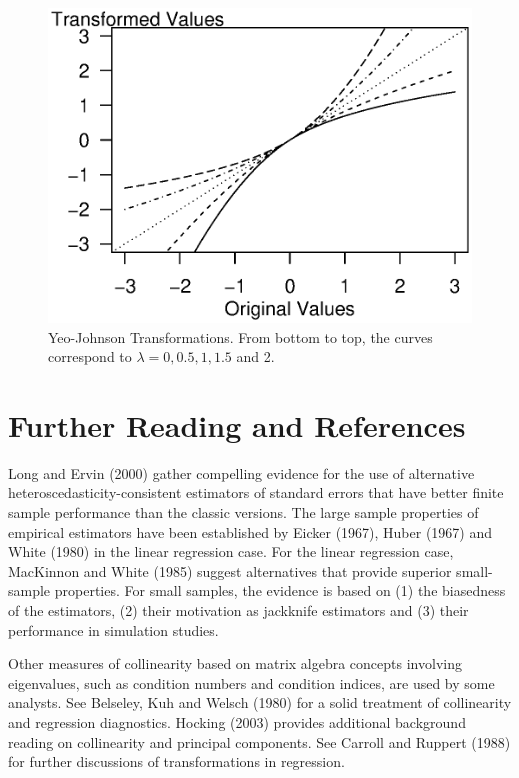 \begin{figure}[htp]
  \centering
    \includegraphics[width=.6\textwidth]{Chapter5/F5Transform.eps}
\caption{\label{F5:Transform} \small Yeo-Johnson Transformations.
From bottom to top, the curves correspond to $\lambda =0,0.5,1,1.5$
and 2.}
\end{figure}



\section{Further Reading and References}

Long and Ervin (2000) gather compelling evidence for the use of
alternative \newline heteroscedasticity-consistent estimators of
standard errors that have better finite sample performance than the
classic versions. The large sample properties of empirical
estimators have been established by Eicker (1967), Huber (1967) and
White (1980) in the linear regression case. For the linear
regression case, MacKinnon and White (1985) suggest alternatives
that provide superior small-sample properties. For small samples,
the evidence is based on (1) the biasedness of the estimators, (2)
their motivation as jackknife estimators and (3) their performance
in simulation studies.

Other measures of collinearity based on matrix algebra concepts
involving eigenvalues, such as condition numbers and condition
indices, are used by some analysts. See Belseley, Kuh and Welsch
(1980) for a solid treatment of collinearity and regression
diagnostics. Hocking (2003) provides additional background reading
on collinearity and principal components. See Carroll and Ruppert
(1988) for further discussions of transformations in regression.

\bigskip

